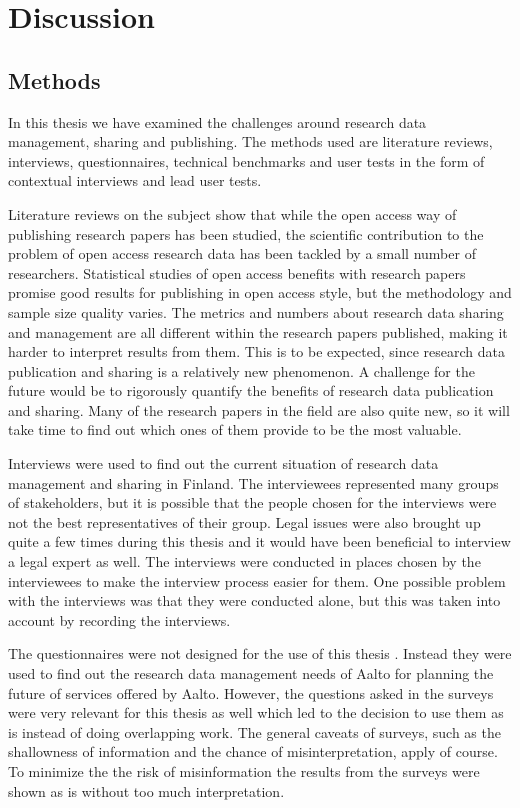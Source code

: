 \chapter{Discussion}
\label{chapter:discussion}

\section{Methods}

In this thesis we have examined the challenges around research data management,
sharing and publishing. The methods used are literature reviews,
interviews, questionnaires, technical benchmarks and user tests in the form of contextual
interviews and lead user tests.

Literature reviews on the subject show that while the open access way of
publishing research papers has been studied, the scientific contribution to
the problem of open access research data has been tackled by a small number
of researchers. Statistical studies of open access benefits with research
papers promise good results for publishing in open access style, but the
methodology and sample size quality varies. The metrics and numbers about
research data sharing and management are all different within the research
papers published, making it harder to interpret results from them. This is to
be expected, since research data publication and sharing is a relatively new
phenomenon. A challenge for the future would be to rigorously quantify the
benefits of research data publication and sharing. Many of the research papers
in the field are also quite new, so it will take time to find out which ones
of them provide to be the most valuable.

Interviews were used to find out the current situation of research data
management and sharing in Finland. The interviewees represented many groups
of stakeholders, but it is possible that the people chosen for the interviews
were not the best representatives of their group. Legal issues were also
brought up quite a few times during this thesis and it would have been
beneficial to interview a legal expert as well. The interviews were conducted
in places chosen by the interviewees to make the interview process easier
for them. One possible problem with the interviews was that they were
conducted alone, but this was taken into account by recording the interviews.

The questionnaires were not designed for the use of this thesis \cite{survey1, survey2}. Instead they were used
to find out the research data management needs of Aalto for planning the
future of services offered by Aalto. However, the questions asked in the
surveys were very relevant for this thesis as well which led to the decision
to use them as is instead of doing overlapping work. The general caveats of
surveys, such as the shallowness of information and the chance of
misinterpretation, apply of course. To minimize the the risk of misinformation
the results from the surveys were shown as is without too much interpretation.

